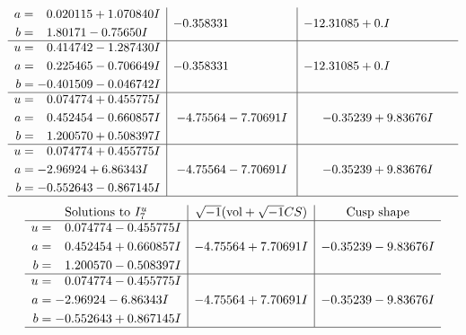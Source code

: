 \documentclass[1p]{elsarticle_modified}
\theoremstyle{definition}
\newcommand{\I}{\sqrt{-1}}
\begin{document}
$$\begin{array}{c|c|c}
\begin{aligned}
a &= \phantom{-}0.020115 + 1.070840 I \\
b &= \phantom{-}1.80171 - 0.75650 I\end{aligned}
 & -0.358331\phantom{ +0.000000I} & -12.31085 + 0. I\phantom{ +0.000000I} \\ \hline\begin{aligned}
u &= \phantom{-}0.414742 - 1.287430 I \\
a &= \phantom{-}0.225465 - 0.706649 I \\
b &= -0.401509 - 0.046742 I\end{aligned}
 & -0.358331\phantom{ +0.000000I} & -12.31085 + 0. I\phantom{ +0.000000I} \\ \hline\begin{aligned}
u &= \phantom{-}0.074774 + 0.455775 I \\
a &= \phantom{-}0.452454 - 0.660857 I \\
b &= \phantom{-}1.200570 + 0.508397 I\end{aligned}
 & -4.75564 - 7.70691 I & -0.35239 + 9.83676 I \\ \hline\begin{aligned}
u &= \phantom{-}0.074774 + 0.455775 I \\
a &= -2.96924 + 6.86343 I \\
b &= -0.552643 - 0.867145 I\end{aligned}
 & -4.75564 - 7.70691 I & -0.35239 + 9.83676 I\\
 \hline 
 \end{array}$$\newpage$$\begin{array}{c|c|c}  
\text{Solutions to }I^u_{7}& \I (\text{vol} + \sqrt{-1}CS) & \text{Cusp shape}\\
 \hline 
\begin{aligned}
u &= \phantom{-}0.074774 - 0.455775 I \\
a &= \phantom{-}0.452454 + 0.660857 I \\
b &= \phantom{-}1.200570 - 0.508397 I\end{aligned}
 & -4.75564 + 7.70691 I & -0.35239 - 9.83676 I \\ \hline\begin{aligned}
u &= \phantom{-}0.074774 - 0.455775 I \\
a &= -2.96924 - 6.86343 I \\
b &= -0.552643 + 0.867145 I\end{aligned}
 & -4.75564 + 7.70691 I & -0.35239 - 9.83676 I\\
 \hline 
 \end{array}$$\newpage\newpage\renewcommand{\arraystretch}{1}
\end{document}
